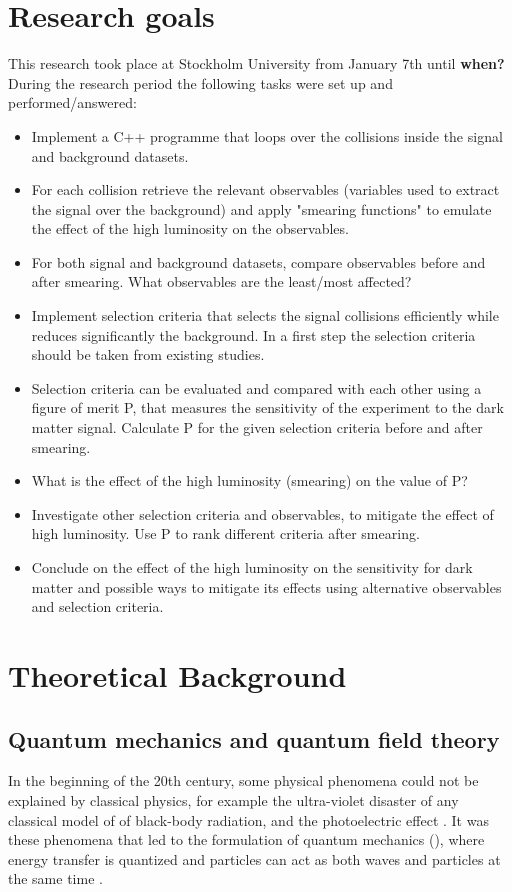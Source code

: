 \section{Research goals}\label{sec:goals}
This research took place at Stockholm University from January 7th until \textbf{when?}
During the research period the following tasks were set up and performed/answered:
\begin{itemize}
\item Implement a C++ programme that loops over the collisions inside the signal and background datasets.	
\item For each collision retrieve the relevant observables (variables used to	 extract the signal over the background) and apply "smearing functions" to emulate the effect of the high luminosity on the observables. 	
\item For both signal and background datasets, compare observables before and after smearing. What observables are the least/most affected?	
\item Implement selection criteria that selects the signal collisions efficiently while reduces significantly the background. In a first step the selection criteria should be taken from existing studies.
\item Selection criteria can be evaluated and compared with each other using a figure of merit P, that measures the sensitivity of the experiment to the	 dark matter signal. Calculate P for the given selection criteria before and after smearing.
\item What is the effect of the high luminosity (smearing) on the value of P?
\item Investigate other selection criteria and observables, to mitigate the effect of high luminosity. Use P to rank different criteria after smearing.
\item Conclude on the effect of the high luminosity on the sensitivity for dark matter and possible ways to mitigate its effects using alternative observables and selection criteria. 
\end{itemize}
\newpage
\section{Theoretical Background}\label{sec:tb}
\subsection{Quantum mechanics and quantum field theory}\label{sec:tb:subsec:qm}
In the beginning of the 20th century, some physical phenomena could not be explained by classical physics, for example the ultra-violet disaster of any classical model of of black-body radiation, and the photoelectric effect \citep{Bransden:2000}.
It was these phenomena that led to the formulation of quantum mechanics (\abbrQM), where energy transfer is quantized and particles can act as both waves and particles at the same time \citep{Hallsjo:2013}.

